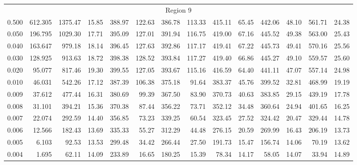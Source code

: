 \begin{tabular}{@{}lrrrrrrrrrrrrr@{}}
\midrule
\multicolumn{14}{c}{Region 9} \\
\cmidrule{1-14}
0.500 & 612.305 & 1375.47 & 15.85 & 388.97 & 122.63 & 386.78 & 113.33 & 415.11 & 65.45 & 442.06 & 48.10 & 561.71 & 24.38 \\
0.050 & 196.795 & 1029.30 & 17.71 & 395.09 & 127.01 & 391.94 & 116.75 & 419.00 & 67.16 & 445.52 & 49.38 & 563.00 & 25.43 \\
0.040 & 163.647 & 979.18 & 18.14 & 396.45 & 127.63 & 392.86 & 117.17 & 419.41 & 67.22 & 445.73 & 49.41 & 570.16 & 25.56 \\
0.030 & 128.925 & 913.63 & 18.72 & 398.38 & 128.52 & 393.84 & 117.27 & 419.40 & 66.86 & 445.27 & 49.10 & 559.57 & 25.60 \\
0.020 & 95.077 & 817.46 & 19.30 & 399.55 & 127.05 & 393.67 & 115.16 & 416.59 & 64.40 & 441.11 & 47.07 & 557.14 & 24.98 \\
0.010 & 46.031 & 542.26 & 17.12 & 387.39 & 106.38 & 375.18 & 91.64 & 383.37 & 45.76 & 399.52 & 32.81 & 468.99 & 19.19 \\
0.009 & 37.612 & 477.44 & 16.31 & 380.69 & 99.39 & 367.50 & 83.90 & 370.73 & 40.63 & 383.85 & 29.15 & 439.19 & 17.78 \\
0.008 & 31.101 & 394.21 & 15.36 & 370.38 & 87.44 & 356.22 & 73.71 & 352.12 & 34.48 & 360.64 & 24.94 & 401.65 & 16.25 \\
0.007 & 22.074 & 292.59 & 14.40 & 356.85 & 73.23 & 339.25 & 60.54 & 323.45 & 27.52 & 324.42 & 20.47 & 329.44 & 14.78 \\
0.006 & 12.566 & 182.43 & 13.69 & 335.33 & 55.27 & 312.29 & 44.48 & 276.15 & 20.59 & 269.99 & 16.43 & 206.19 & 13.73 \\
0.005 & 6.103 & 92.53 & 13.53 & 299.48 & 34.42 & 266.44 & 27.50 & 191.73 & 15.47 & 156.74 & 14.06 & 70.19 & 13.62 \\
0.004 & 1.695 & 62.11 & 14.09 & 233.89 & 16.65 & 180.25 & 15.39 & 78.34 & 14.17 & 58.05 & 14.07 & 33.94 & 14.89 \\


\end{tabular}
